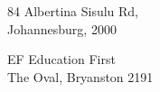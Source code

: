 
{84 Albertina Sisulu Rd,\\ Johannesburg, 2000}

\divider

{EF Education First\\The Oval, Bryanston 2191}
